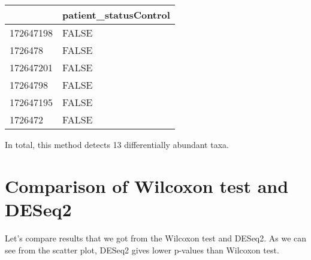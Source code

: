 \documentclass[
]{book}
\newenvironment{Shaded}{\begin{snugshade}}{\end{snugshade}}
\newcommand{\AttributeTok}[1]{\textcolor[rgb]{0.77,0.63,0.00}{#1}}
\newcommand{\DecValTok}[1]{\textcolor[rgb]{0.00,0.00,0.81}{#1}}
\newcommand{\FunctionTok}[1]{\textcolor[rgb]{0.00,0.00,0.00}{#1}}
\newcommand{\NormalTok}[1]{#1}
\newcommand{\OtherTok}[1]{\textcolor[rgb]{0.56,0.35,0.01}{#1}}
\newcommand{\SpecialCharTok}[1]{\textcolor[rgb]{0.00,0.00,0.00}{#1}}
\newcommand{\StringTok}[1]{\textcolor[rgb]{0.31,0.60,0.02}{#1}}
\begin{document}
\begin{Shaded}
\end{Shaded}

\begin{table}
\centering
\begin{tabular}{l|l}
\hline
  & patient\_statusControl\\
\hline
172647198 & FALSE\\
\hline
1726478 & FALSE\\
\hline
172647201 & FALSE\\
\hline
17264798 & FALSE\\
\hline
172647195 & FALSE\\
\hline
1726472 & FALSE\\
\hline
\end{tabular}
\end{table}

In total, this method detects 13 differentially abundant taxa.

\hypertarget{comparison-of-wilcoxon-test-and-deseq2}{%
\section{Comparison of Wilcoxon test and DESeq2}\label{comparison-of-wilcoxon-test-and-deseq2}}

Let's compare results that we got from the Wilcoxon test and DESeq2.
As we can see from the scatter plot, DESeq2 gives lower p-values than Wilcoxon test.

\begin{Shaded}
\end{Shaded}
\end{document}
